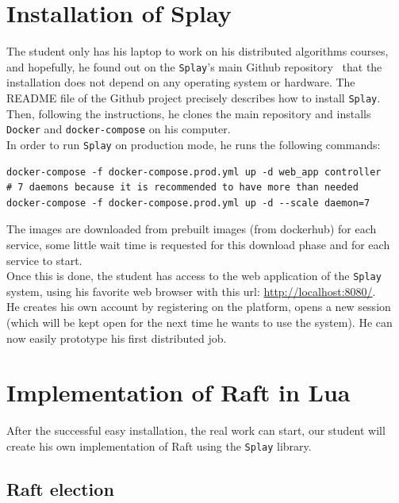\documentclass{eplmastersthesis}
\begin{document}
    \section{Installation of Splay}

      The student only has his laptop to work on his distributed algorithms
      courses, and hopefully, he found out on the \texttt{Splay}'s main Github
      repository~\cite{SplayV2Git} that the installation does not depend on
      any operating system or hardware. The README file of the Github project
      precisely describes how to install \texttt{Splay}. Then, following the
      instructions, he clones the main repository and installs \texttt{Docker} and
      \texttt{docker-compose} on his computer.\\
      In order to run \texttt{Splay} on production mode, he runs the following
      commands: \\

      \begin{lstlisting}[style=MyBash]
docker-compose -f docker-compose.prod.yml up -d web_app controller
# 7 daemons because it is recommended to have more than needed
docker-compose -f docker-compose.prod.yml up -d --scale daemon=7
      \end{lstlisting}

      The images are downloaded from prebuilt images (from dockerhub) for
      each service, some little wait time is requested for this download
      phase and for each service to start.\\
      Once this is done, the student has access to the web application of
      the \texttt{Splay} system, using his favorite web browser with this url:
      \url{http://localhost:8080/}.\\
      He creates his own account by registering on the platform, opens a new
      session (which will be kept open for the next time he wants to use
      the system). He can now easily prototype his first distributed job.

    \section{Implementation of Raft in Lua}

      After the successful easy installation, the real work can start, our
      student will create his own implementation of Raft using the \texttt{Splay}
      library.

      \subsection{Raft election}
\end{document}
